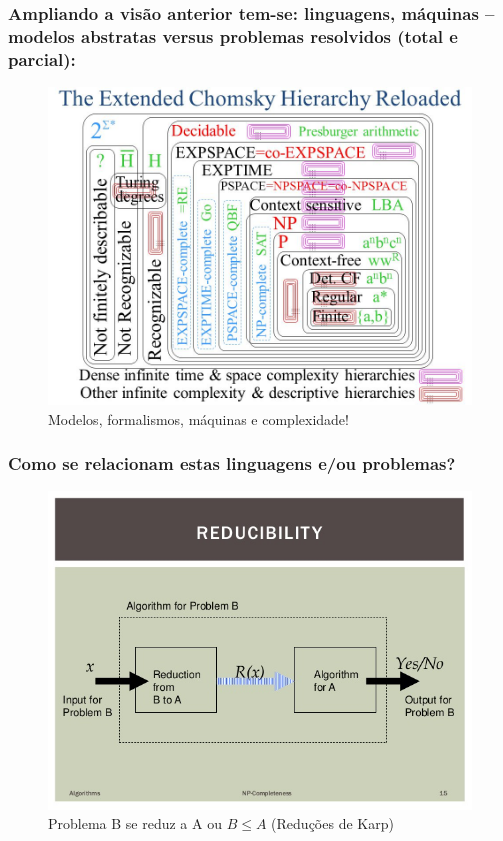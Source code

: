 \documentclass[10pt]{beamer}
\begin{document}
\begin{frame}[fragile]

\frametitle{Ampliando a visão anterior tem-se: linguagens, máquinas -- modelos abstratas  versus problemas resolvidos (total e parcial): }

\begin{figure}[!ht]
\centering
\includegraphics[height =.65\textheight,width=.8\textwidth]
{figuras/Extended+Chomsky+Hierarchy.jpg}
\caption{Modelos, formalismos, máquinas e complexidade!}
\end{figure}

\end{frame}



\begin{frame}[fragile]
\frametitle{Como se relacionam estas linguagens e/ou problemas?}
\begin{figure}[!ht]
	\centering
	\includegraphics[height =.7\textheight,width=.8\textwidth]
	{figuras/reducao01.jpg}
	\caption{Problema B se reduz a A ou $ B \le A$ (Reduções de Karp)}
\end{figure}

\end{frame}
\end{document}
